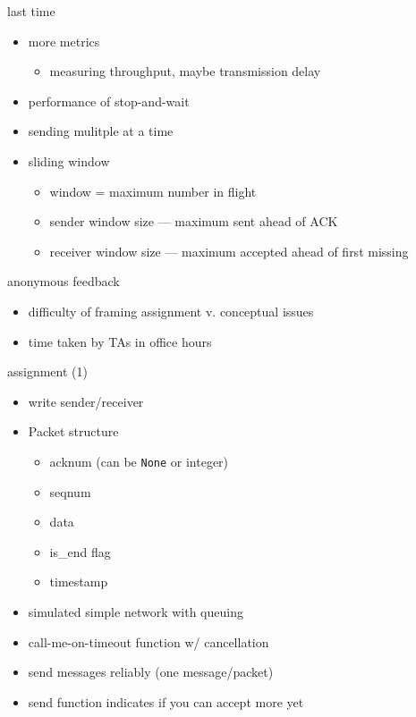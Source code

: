 \date{}
\title{}
\date{}
\usepackage{pgfplots}
\pgfplotsset{compat=1.16}

\begin{frame}
    \titlepage
\end{frame}

\begin{frame}{last time}
    \begin{itemize}
    \item more metrics
        \begin{itemize}
        \item measuring throughput, maybe transmission delay
        \end{itemize}
    \item performance of stop-and-wait
    \item sending mulitple at a time
    \item sliding window
        \begin{itemize}
        \item window = maximum number in flight
        \item sender window size --- maximum sent ahead of ACK
        \item receiver window size --- maximum accepted ahead of first missing
        \end{itemize}
    \end{itemize}
\end{frame}

\begin{frame}{anonymous feedback}
    \begin{itemize}
    \item difficulty of framing assignment v. conceptual issues
    \item time taken by TAs in office hours
    \end{itemize}
\end{frame}

\begin{frame}{assignment (1)}
    \begin{itemize}
    \item write sender/receiver
    \item Packet structure
        \begin{itemize}
        \item acknum (can be \texttt{None} or integer)
        \item seqnum
        \item data
        \item is\_end flag
        \item timestamp
        \end{itemize}
    \item simulated simple network with queuing
    \item call-me-on-timeout function w/ cancellation
    \item send messages reliably (one message/packet)
    \item send function indicates if you can accept more yet
    \end{itemize}
\end{frame}

